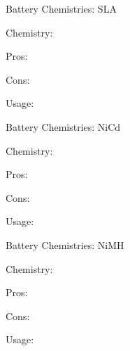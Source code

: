 \documentclass[12pt,t]{beamer}
\begin{document}
\begin{frame}[c]{Battery Chemistries: SLA }
\bbi    
\item Chemistry:
\item Pros:     
\item Cons:
\item Usage:
\ei     
\end{frame}

\begin{frame}[c]{Battery Chemistries: NiCd }
\bbi    
\item Chemistry:
\item Pros:     
\item Cons:
\item Usage:
\ei     
\end{frame}

\begin{frame}[c]{Battery Chemistries: NiMH }
\bbi    
\item Chemistry:
\item Pros:     
\item Cons:
\item Usage:
\ei     
\end{frame}
\end{document}
